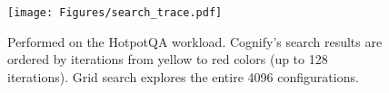 {
\begin{figure}[htbp]
\begin{center}
\centerline{\texttt{[image: Figures/search\_trace.pdf]}}
\vspace{-0.1in}
{
Performed on the HotpotQA workload. Cognify's search results are ordered by iterations from yellow to red colors (up to 128 iterations). Grid search explores the entire 4096 configurations. 
}
\label{fig-searchtrace}
\end{center}
\end{figure}
}


